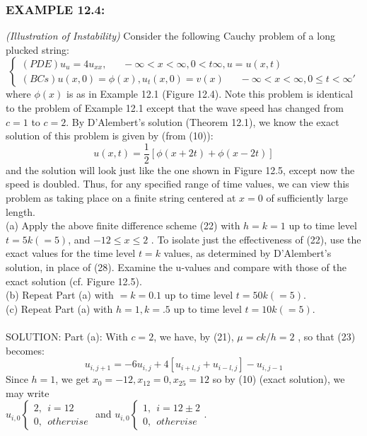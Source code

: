 \documentclass[../main.tex]{subfiles}
\begin{document}
{{\subsubsection{EXAMPLE 12.4:}
 \textit{(Illustration of Instability)} Consider the following Cauchy 
problem of a long plucked string: 
$$\begin{cases} 
	(PDE)u_u=4u_{xx}, ~~~~~~~ - \infty< x< \infty, 0<t \infty , u=u(x,t) \\ 
	(BCs) u(x,0)=\phi (x), u_t(x,0)=v(x) ~~~~~~~
	-\infty< x< \infty, 0\leqslant t< \infty ' 
\end{cases}$$
where $\phi(x)$ is as in Example 12.1 (Figure 12.4). Note this problem is identical to the problem of Example 12.1 except that the wave speed has changed from $c = 1$ to $c = 2$. By D'Alembert's solution (Theorem 12.1), we know the exact solution of this problem is given by (from (10)):
$$u(x,t)=\dfrac{1}{2}[\phi(x+2t)+\phi(x-2t)]$$ 
and the solution will look just like the one shown in Figure 12.5, except now the speed is doubled. Thus, for any specified range of time values, we can view this problem as taking place on a finite string centered at $x = 0$ of sufficiently large length.
\\
(a) Apply the above finite difference scheme (22) with $h = k = 1$ up to time level $t = 5k(= 5)$, and $-12 \leqslant x \leqslant 2$ . To isolate just the effectiveness of (22), use the exact values for the time level $t = k$ values, as determined by D'Alembert's solution, in place of (28). Examine the u-values and compare with those of the exact solution (cf. Figure 12.5). 
\\
(b) Repeat Part (a) with $ = k = 0.1$ up to time level $t = 50k (= 5)$.
\\ 
(c) Repeat Part (a) with $h = 1, k = .5$ up to time level $t = 10k (= 5)$.
\\
\\
SOLUTION: Part (a): With $c = 2$, we have, by (21), $\mu = ck/h = 2$ , so that (23) becomes: 
$$u_{i,j+1}=-6u_{i,j}+4[u_{i+l,j}+u_{i-l,j}]-u_{i,j-1}$$
Since $h = 1$, we get $x_0 = -12, x_{12} = 0, x_{25} = 12$ so by (10) (exact solution), we may write
\\
$u_{i,0}
	\begin{cases}
		2, ~~i=12\\
		0, ~~othervise
	\end{cases}$ and
$u_{i,0}
	\begin{cases}
		1, ~~i=12\pm 2\\
		0, ~~othervise
	\end{cases}$. 
}}
\end{document}
